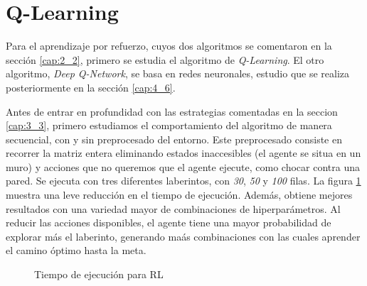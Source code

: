 			
			

\section{Q-Learning}	
	
	Para el aprendizaje por refuerzo, cuyos dos algoritmos se comentaron en la sección \ref{cap:2_2}, primero se estudia el algoritmo de \textit{Q-Learning}. El otro algoritmo, \textit{Deep Q-Network}, se basa en redes neuronales, estudio que se realiza posteriormente en la sección \ref{cap:4_6}.
	
	
		Antes de entrar en profundidad con las estrategias comentadas en la seccion \ref{cap:3_3}, primero estudiamos el comportamiento del algoritmo de manera secuencial, con y sin preprocesado del entorno. Este preprocesado consiste en recorrer la matriz entera eliminando estados inaccesibles (el agente se situa en un muro) y acciones que no queremos que el agente ejecute, como chocar contra una pared. Se ejecuta con tres diferentes laberintos, con \textit{30}, \textit{50} y \textit{100} filas. La figura \ref{fig:rl_preprocesado} muestra una leve reducción en el tiempo de ejecución. Además, obtiene mejores resultados con una variedad mayor de combinaciones de hiperparámetros. Al reducir las acciones disponibles, el agente tiene una mayor probabilidad de explorar más el laberinto, generando maás combinaciones con las cuales aprender el camino óptimo hasta la meta.			
	

		\begin{figure}[!h]
			\centering
			\caption{Tiempo de ejecución para RL}
			\label{fig:rl_preprocesado}
		\end{figure}
		
